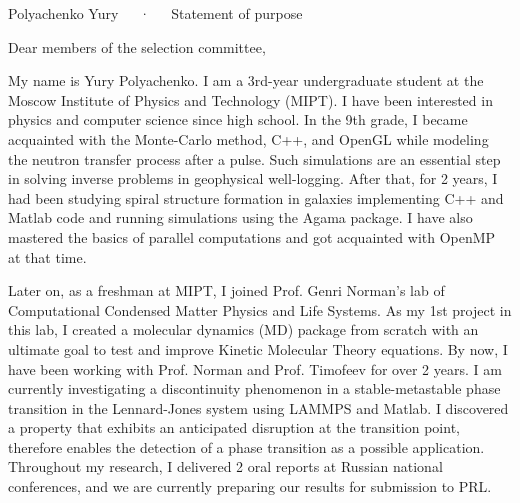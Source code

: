 \documentclass[12pt, a4paper]{awesome-cv}
\begin{document}
\makecvheader[C]

\makecvfooter
  {\thepage}
  {Polyachenko Yury~~~·~~~Statement of purpose}
  {\thepage}

\vspace{25pt}
\hspace{5pt} Dear members of the selection committee, 

\begin{cvletter}


My name is Yury Polyachenko. I am a 3rd-year undergraduate student at the Moscow Institute of Physics and Technology (MIPT). I have been interested in physics and computer science since high school. In the 9th grade, I became acquainted with the Monte-Carlo method, C++, and OpenGL while modeling the neutron transfer process after a pulse. Such simulations are an essential step in solving inverse problems in geophysical well-logging. After that, for 2 years, I had been studying spiral structure formation in galaxies implementing C++ and Matlab code and running simulations using the Agama package. I have also mastered the basics of parallel computations and got acquainted with OpenMP at that time. 

Later on, as a freshman at MIPT, I joined Prof. Genri Norman’s lab of Computational Condensed Matter Physics and Life Systems. As my 1st project in this lab, I created a molecular dynamics (MD) package from scratch with an ultimate goal to test and improve Kinetic Molecular Theory equations. By now, I have been working with Prof. Norman and Prof. Timofeev for over 2 years. I am currently investigating a discontinuity phenomenon in a stable-metastable phase transition in the Lennard-Jones system using LAMMPS and Matlab. I discovered a property that exhibits an anticipated disruption at the transition point, therefore enables the detection of a phase transition as a possible application. Throughout my research, I delivered 2 oral reports at Russian national conferences, and we are currently preparing our results for submission to PRL. 


\end{cvletter}
\end{document}
